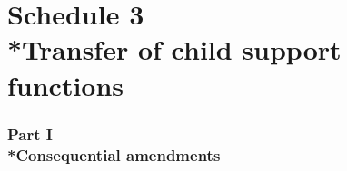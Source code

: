 \documentclass[12pt,a4paper]{article}
\begin{document}

\part[Schedule 3 --- Transfer of child support functions]{Schedule 3\\*Transfer of child support functions}

\renewcommand\parthead{--- Schedule 3}


\section[Part I --- Consequential amendments]{Part I\\*Consequential amendments}
\end{document}
